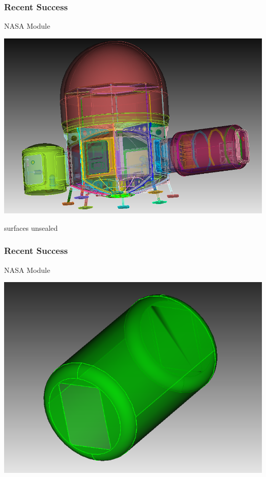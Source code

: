 \documentclass[14pt]{beamer}
\begin{document}
\begin{frame}
\frametitle{Recent Success}

NASA Module
\begin{center}
\includegraphics[scale=0.3]{nasa_module.png}
\end{center}
 surfaces unsealed
\end{frame}

\begin{frame}
\frametitle{Recent Success}

NASA Module
\begin{center}
\includegraphics[scale=0.35]{bad_faceting.png}
\end{center}
\end{frame}
\end{document}

